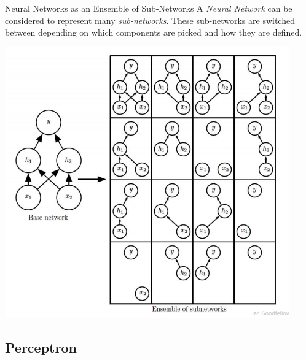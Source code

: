 \documentclass[11pt,a4paper]{article}
\begin{document}
\begin{proposition}{Neural Networks as an Ensemble of Sub-Networks}
  A \textit{Neural Network} can be considered to represent many \textit{sub-networks}. These sub-networks are switched between depending on which components are picked and how they are defined.
  \begin{center}
    \includegraphics[width=.35\textwidth]{SubNeuralNetworks.PNG}
  \end{center}
\end{proposition}

\subsection{Perceptron}
\end{document}
